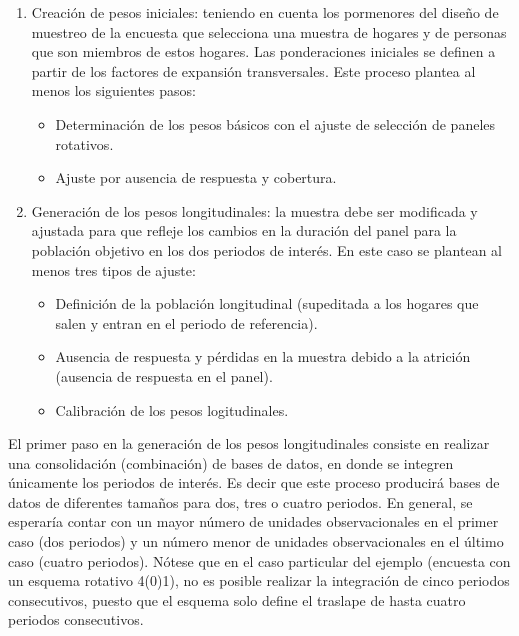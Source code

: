 \documentclass[
  12pt,
  spanish,
]{book}
\providecommand{\tightlist}{%
  \setlength{\itemsep}{0pt}\setlength{\parskip}{0pt}}
\begin{document}
\begin{enumerate}
\def\labelenumi{\arabic{enumi}.}
\tightlist
\item
  Creación de pesos iniciales: teniendo en cuenta los pormenores del diseño de muestreo de la encuesta que selecciona una muestra de hogares y de personas que son miembros de estos hogares. Las ponderaciones iniciales se definen a partir de los factores de expansión transversales. Este proceso plantea al menos los siguientes pasos:

  \begin{itemize}
  \tightlist
  \item
    Determinación de los pesos básicos con el ajuste de selección de paneles rotativos.
  \item
    Ajuste por ausencia de respuesta y cobertura.
  \end{itemize}
\item
  Generación de los pesos longitudinales: la muestra debe ser modificada y ajustada para que refleje los cambios en la duración del panel para la población objetivo en los dos periodos de interés. En este caso se plantean al menos tres tipos de ajuste:

  \begin{itemize}
  \tightlist
  \item
    Definición de la población longitudinal (supeditada a los hogares que salen y entran en el periodo de referencia).
  \item
    Ausencia de respuesta y pérdidas en la muestra debido a la atrición (ausencia de respuesta en el panel).
  \item
    Calibración de los pesos logitudinales.
  \end{itemize}
\end{enumerate}

El primer paso en la generación de los pesos longitudinales consiste en realizar una consolidación (combinación) de bases de datos, en donde se integren únicamente los periodos de interés. Es decir que este proceso producirá bases de datos de diferentes tamaños para dos, tres o cuatro periodos. En general, se esperaría contar con un mayor número de unidades observacionales en el primer caso (dos periodos) y un número menor de unidades observacionales en el último caso (cuatro periodos). Nótese que en el caso particular del ejemplo (encuesta con un esquema rotativo 4(0)1), no es posible realizar la integración de cinco periodos consecutivos, puesto que el esquema solo define el traslape de hasta cuatro periodos consecutivos.
\end{document}
